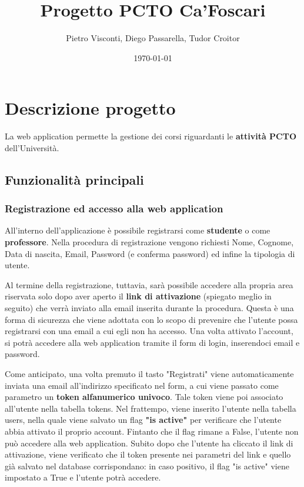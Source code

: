 \documentclass[11pt]{article}
\author{Pietro Visconti, Diego Passarella, Tudor Croitor}
\date{\today}
\title{Progetto PCTO Ca'Foscari}
\begin{document}
\maketitle
\tableofcontents


\section{Descrizione progetto}
\label{sec:org8f69278}
La web application permette la gestione dei corsi riguardanti le \textbf{attività PCTO} dell'Università.

\subsection{Funzionalità principali}
\label{sec:orgb0602f0}

\subsubsection{Registrazione ed accesso alla web application}
\label{sec:org18376f2}
All'interno dell'applicazione è possibile registrarsi come \textbf{studente} o come \textbf{professore}.
Nella procedura di registrazione vengono richiesti Nome, Cognome, Data di nascita, Email, Password (e conferma password) ed infine la tipologia di utente.

Al termine della registrazione, tuttavia, sarà possibile accedere alla propria area riservata solo dopo aver aperto il \textbf{link di attivazione} (spiegato meglio in seguito) che verrà inviato alla email inserita durante la procedura. Questa è una forma di sicurezza che viene adottata con lo scopo di prevenire che l'utente possa registrarsi con una email a cui egli non ha accesso. Una volta attivato l'account, si potrà accedere alla web application tramite il form di login, inserendoci email e password.

Come anticipato, una volta premuto il tasto "Registrati" viene automaticamente inviata una email all'indirizzo specificato nel form, a cui viene passato come parametro un \textbf{token alfanumerico univoco}. Tale token viene poi associato all'utente nella tabella tokens. Nel frattempo, viene inserito l'utente nella tabella users, nella quale viene salvato un flag \textbf{"is active"} per verificare che l'utente abbia attivato il proprio account. Fintanto che il flag rimane a False, l'utente non può accedere alla web application. Subito dopo che l'utente ha cliccato il link di attivazione, viene verificato che il token presente nei parametri del link e quello già salvato nel database corrispondano: in caso positivo, il flag "is active" viene impostato a True e l'utente potrà accedere.
\end{document}
